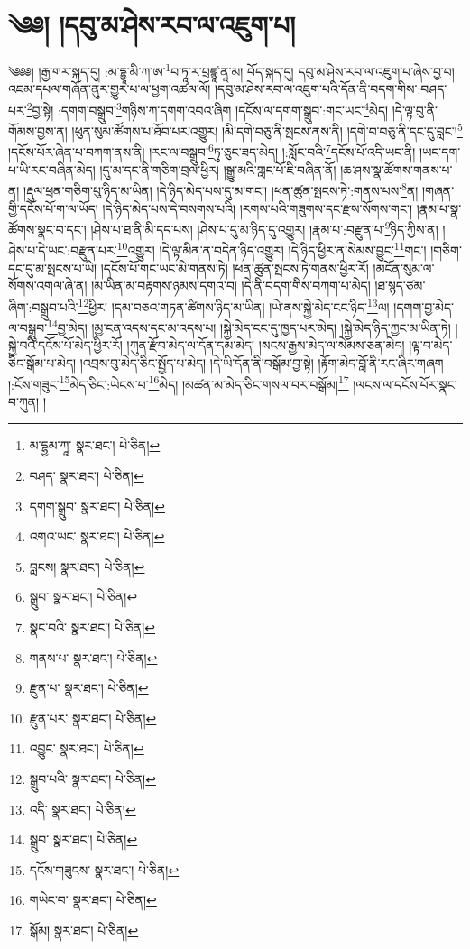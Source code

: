\setcounter{footnote}{0} 
\chapter{༄༅། །དབུ་མ་ཤེས་རབ་ལ་འཇུག་པ།}༄༅༅། །རྒྱ་གར་སྐད་དུ། :མ་དྷྱཱ་མི་ཀ་ཨ་\footnote{མ་དྷྱམ་ཀཱ་  སྣར་ཐང་།  པེ་ཅིན། }བ་ཏཱ་ར་པྲཛྙཱ་ནཱ་མ། བོད་སྐད་དུ། དབུ་མ་ཤེས་རབ་ལ་འཇུག་པ་ཞེས་བྱ་བ། འཇམ་དཔལ་གཞོན་ནུར་གྱུར་པ་ལ་ཕྱག་འཚལ་ལོ། །དབུ་མ་ཤེས་རབ་ལ་འཇུག་པའི་དོན་ནི་བདག་གིས་:བཤད་པར་\footnote{བཤད་  སྣར་ཐང་།  པེ་ཅིན། }བྱ་སྟེ། :དགག་བསྒྲུབ་\footnote{དགག་སྒྲུབ་  སྣར་ཐང་།  པེ་ཅིན། }གཉིས་ཀ་དགག་འབའ་ཞིག །དངོས་ལ་དགག་སྒྲུབ་:གང་ཡང་\footnote{འགའ་ཡང་  སྣར་ཐང་།  པེ་ཅིན། }མེད། །དེ་ལྟ་བུ་ནི་གོམས་བྱས་ན། །ཕུན་སུམ་ཚོགས་པ་ཐོབ་པར་འགྱུར། །མི་དགེ་བཅུ་ནི་སྤངས་ནས་ནི། །དགེ་བ་བཅུ་ནི་དང་དུ་བླང་།\footnote{བླངས།  སྣར་ཐང་།  པེ་ཅིན། } །དངོས་པོར་ཞེན་པ་བཀག་ནས་ནི། །རང་ལ་བསྒྲུབ་\footnote{སྒྲུབ་  སྣར་ཐང་།  པེ་ཅིན། }ཏུ་ཅུང་ཟད་མེད། །:སློང་བའི་\footnote{སྣང་བའི་  སྣར་ཐང་།  པེ་ཅིན། }དངོས་པོ་འདི་ཡང་ནི། །ཡང་དག་པ་ཡི་རང་བཞིན་མེད། །དུ་མ་དང་ནི་གཅིག་བྲལ་ཕྱིར། །སྒྱུ་མའི་གླང་པོ་ཇི་བཞིན་ནོ། །ཆ་ཤས་སྣ་ཚོགས་གནས་པ་ན། །རྡུལ་ཕྲན་གཅིག་པུ་ཉིད་མ་ཡིན། །དེ་ཉིད་མེད་པས་དུ་མ་གང་། །ཕན་ཚུན་སྤངས་ཏེ་:གནས་པས་\footnote{གནས་པ་  སྣར་ཐང་།  པེ་ཅིན། }ན། །གཞན་གྱི་དངོས་པོ་ག་ལ་ཡོད། །དེ་ཉིད་མེད་པས་དེ་བསགས་པའི། །རགས་པའི་གཟུགས་དང་རྫས་སོགས་གང་། །རྣམ་པ་སྣ་ཚོགས་སྣང་བ་དང་། །ཤེས་པ་ཐ་ནི་མི་དད་པས། །ཤེས་པ་དུ་མ་ཉིད་དུ་འགྱུར། །རྣམ་པ་:བརྫུན་པ་\footnote{རྫུན་པ་  སྣར་ཐང་།  པེ་ཅིན། }ཉིད་ཀྱིས་ན། །ཤེས་པ་དེ་ཡང་:བརྫུན་པར་\footnote{རྫུན་པར་  སྣར་ཐང་།  པེ་ཅིན། }འགྱུར། །དེ་ལྟ་མིན་ན་བདེན་ཉིད་འགྱུར། །དེ་ཉིད་ཕྱིར་ན་སེམས་བྱུང་\footnote{འབྱུང་  སྣར་ཐང་།  པེ་ཅིན། }གང་། །གཅིག་དང་དུ་མ་སྤངས་པ་ཡི། །དངོས་པོ་གང་ཡང་མི་གནས་ཏེ། །ཕན་ཚུན་སྤངས་ཏེ་གནས་ཕྱིར་རོ། །མངོན་སུམ་ལ་སོགས་འགལ་ཞེ་ན། །མ་ཡིན་མ་བརྟགས་ཉམས་དགའ་བ། །དེ་ནི་བདག་གིས་བཀག་པ་མེད། །ཐ་སྙད་ཙམ་ཞིག་:བསྒྲུབ་པའི་\footnote{སྒྲུབ་པའི་  སྣར་ཐང་།  པེ་ཅིན། }ཕྱིར། །དམ་བཅའ་གཏན་ཚིགས་ཉིད་མ་ཡིན། །ཡེ་ནས་སྐྱེ་མེད་ངང་ཉིད་\footnote{འདི་  སྣར་ཐང་།  པེ་ཅིན། }ལ། །དགག་བྱ་མེད་ལ་བསྒྲུབ་\footnote{སྒྲུབ་  སྣར་ཐང་།  པེ་ཅིན། }བྱ་མེད། །མྱ་ངན་འདས་དང་མ་འདས་པ། །སྐྱེ་མེད་ངང་དུ་ཁྱད་པར་མེད། །སྐྱེ་མེད་ཉིད་ཀྱང་མ་ཡིན་ཏེ། །སྐྱེ་བའི་དངོས་པོ་མེད་ཕྱིར་རོ། །ཀུན་རྫོབ་མེད་ལ་དོན་དམ་མེད། །སངས་རྒྱས་མེད་ལ་སེམས་ཅན་མེད། །ལྟ་བ་མེད་ཅིང་སྒོམ་པ་མེད། །འབྲས་བུ་མེད་ཅིང་སྤྱོད་པ་མེད། །དེ་ཡི་དོན་ནི་བསྒོམ་བྱ་སྟེ། །རྟོག་མེད་བློ་ནི་རང་ཞིར་གཞག །:ངོས་གཟུང་\footnote{དངོས་གཟུངས་  སྣར་ཐང་།  པེ་ཅིན། }མེད་ཅིང་:ཡེངས་པ་\footnote{གཡེང་བ་  སྣར་ཐང་།  པེ་ཅིན། }མེད། །མཚན་མ་མེད་ཅིང་གསལ་བར་བསྒོམ།\footnote{སྒོམ།  སྣར་ཐང་།  པེ་ཅིན། } །ལངས་ལ་དངོས་པོར་སྣང་བ་ཀུན། །
